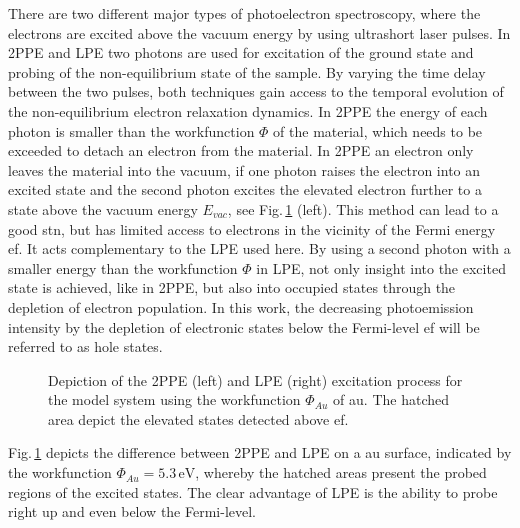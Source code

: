 \documentclass[a4paper,12pt,twoside]{article}
\begin{document}
\label{LPchap}
There are two different major types of photoelectron spectroscopy, where the electrons are excited above the vacuum energy by using ultrashort laser pulses. In \gls{2PPE} and LPE two photons are used for excitation of the ground state and probing of the non-equilibrium state of the sample. By varying the time delay between the two pulses, both techniques gain access to the temporal evolution of the non-equilibrium electron relaxation dynamics. 
In \gls{2PPE} the energy of each photon is smaller than the workfunction $\Phi$ of the material, which needs to be exceeded to detach an electron from the material. In \gls{2PPE} an electron only leaves the material into the vacuum, if one photon raises the electron into an excited state and the second photon excites the elevated electron further to a state above the vacuum energy $E_{vac}$, see Fig.\,\ref{2PPEvsARPES} (left). This method can lead to a good \gls{stn}, but has limited access to electrons in the vicinity of the Fermi energy \gls{ef}. It acts complementary to the \gls{LPE} used here. 
By using a second photon with a smaller energy than the workfunction $\Phi$ in LPE, not only insight into the excited state is achieved, like in \gls{2PPE}, but also into occupied states through the depletion of electron population. In this work, the decreasing photoemission intensity by the depletion of electronic states below the Fermi-level \gls{ef} will be referred to as hole states.
	\begin{figure}[H]
		\caption{Depiction of the \gls{2PPE} (left) and LPE (right) excitation process for the model system using the workfunction $\Phi_{Au}$ of \gls{au}. The hatched area depict the elevated states detected above \gls{ef}.
		}
		    \label{2PPEvsARPES}
	\end{figure}
Fig.\,\ref{2PPEvsARPES} depicts the difference between \gls{2PPE} and LPE on a \gls{au} surface, indicated by the workfunction $\Phi_{Au} = 5.3\,\mathrm{eV}$, whereby the hatched areas present the probed regions of the excited states. The clear advantage of LPE is the ability to probe right up and even below the Fermi-level.
\end{document}
